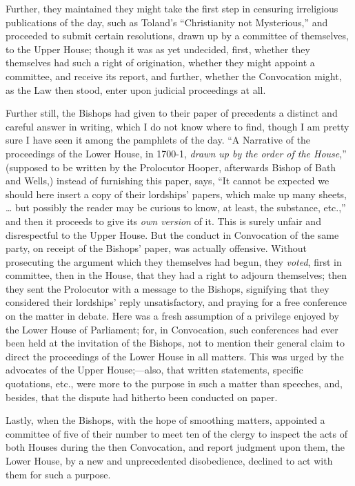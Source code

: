 Further, they maintained they
might take the first step in censuring irreligious publications of the
day, such as Toland's ``Christianity not Mysterious,'' and proceeded to
submit certain resolutions, drawn up by a committee of themselves, to
the Upper House; though it was as yet undecided, first, whether they
themselves had such a right of origination, whether they might appoint
a committee, and receive its report, and further, whether the
Convocation might, as the Law then stood, enter upon judicial
proceedings at all.

Further still, the Bishops had
given to their paper of precedents a distinct and careful answer in
writing, which I do not know where to find, though I am pretty sure I
have seen it among the pamphlets of the day. ``A Narrative of the
proceedings of the Lower House, in 1700-1, \emph{drawn up by the order of
the House},'' (supposed to be written by the Prolocutor Hooper,
afterwards Bishop of Bath and Wells,) instead of furnishing this
paper, says, ``It cannot be expected we should here insert a copy of
their lordships' papers, which make up many sheets, … but possibly
the reader may be curious to know, at least, the substance, etc.,'' and
then it proceeds to give its \emph{own version} of it. This is surely
unfair and disrespectful to the Upper House. But the conduct in
Convocation of the same party, on receipt of the Bishops' paper, was
actually offensive. Without prosecuting the argument which they
themselves had begun, they \emph{voted}, first in committee, then in
the House, that they had a right to adjourn themselves; then they sent
the Prolocutor with a message to the Bishops, signifying that they
considered their lordships' reply unsatisfactory, and praying for a
free conference on the matter in debate. Here was a fresh
assumption of a privilege enjoyed by the Lower House of Parliament;
for, in Convocation, such conferences had ever been held at the
invitation of the Bishops, not to mention their general claim to
direct the proceedings of the Lower House in all matters. This was
urged by the advocates of the Upper House;—also, that written
statements, specific quotations, etc., were more to the purpose in
such a matter than speeches, and, besides, that the dispute had
hitherto been conducted on paper.

Lastly, when the Bishops, with
the hope of smoothing matters, appointed a committee of five of their
number to meet ten of the clergy to inspect the acts of both Houses
during the then Convocation, and report judgment upon them, the Lower
House, by a new and unprecedented disobedience, declined to act with
them for such a purpose.


